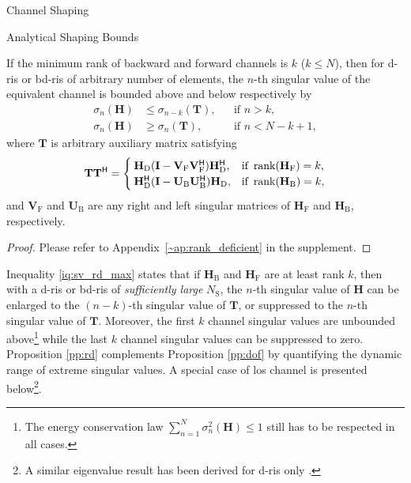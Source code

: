 \documentclass[journal]{IEEEtran}
\begin{document}
\begin{section}{Channel Shaping}
\begin{subsection}{Analytical Shaping Bounds}
		\begin{proposition}
			\label{pp:rd}
			If the minimum rank of backward and forward channels is $k$ ($k \le N$),
			then for \gls{d}-\gls{ris} or \gls{bd}-\gls{ris} of arbitrary number of elements, the $n$-th singular value of the equivalent channel is bounded above and below respectively by
			\begin{subequations}
				\label{iq:sv_rd}
				\begin{align}
					\sigma_n(\mathbf{H}) & \le \sigma_{n-k}(\mathbf{T}), &  & \text{if } n > k, \label{iq:sv_rd_max}          \\
					\sigma_n(\mathbf{H}) & \ge \sigma_n(\mathbf{T}),     &  & \text{if } n < N - k + 1, \label{iq:sv_rd_min}
				\end{align}
			\end{subequations}
			where $\mathbf{T}$ is arbitrary auxiliary matrix satisfying
			\begin{equation}
				\label{eq:auxiliary_rd}
				\mathbf{T} \mathbf{T}^\mathsf{H} =
				\begin{cases}
					\mathbf{H}_\mathrm{D} (\mathbf{I} - \mathbf{V}_\mathrm{F} \mathbf{V}_\mathrm{F}^\mathsf{H}) \mathbf{H}_\mathrm{D}^\mathsf{H}, & \text{if } \operatorname{rank}(\mathbf{H}_\mathrm{F}) = k, \\
					\mathbf{H}_\mathrm{D}^\mathsf{H} (\mathbf{I} - \mathbf{U}_\mathrm{B} \mathbf{U}_\mathrm{B}^\mathsf{H}) \mathbf{H}_\mathrm{D}, & \text{if } \operatorname{rank}(\mathbf{H}_\mathrm{B}) = k,
				\end{cases}
			\end{equation}
			and $\mathbf{V}_\mathrm{F}$ and $\mathbf{U}_\mathrm{B}$ are any right and left singular matrices of $\mathbf{H}_\mathrm{F}$ and $\mathbf{H}_\mathrm{B}$, respectively.
		\end{proposition}
		\begin{proof}
			Please refer to Appendix~\ref{~ap:rank_deficient} in the supplement.
		\end{proof}

		Inequality \eqref{iq:sv_rd_max} states that
		if $\mathbf{H}_\mathrm{B}$ and $\mathbf{H}_\mathrm{F}$ are at least rank $k$, then
		with a \gls{d}-\gls{ris} or \gls{bd}-\gls{ris} of \emph{sufficiently large} $N_\mathrm{S}$,
		the $n$-th singular value of $\mathbf{H}$ can be enlarged to the $(n-k)$-th singular value of $\mathbf{T}$, or suppressed to the $n$-th singular value of $\mathbf{T}$.
		Moreover, the first $k$ channel singular values are unbounded above\footnote{The energy conservation law $\sum_{n=1}^N \sigma_n^2(\mathbf{H}) \le 1$ still has to be respected in all cases.} while the last $k$ channel singular values can be suppressed to zero.
		Proposition \ref{pp:rd} complements Proposition \ref{pp:dof} by quantifying the dynamic range of extreme singular values.
		A special case of \gls{los} channel is presented below\footnote{A similar eigenvalue result has been derived for \gls{d}-\gls{ris} only \cite{Semmler2023}.}.



\end{subsection}
\end{section}
\end{document}
